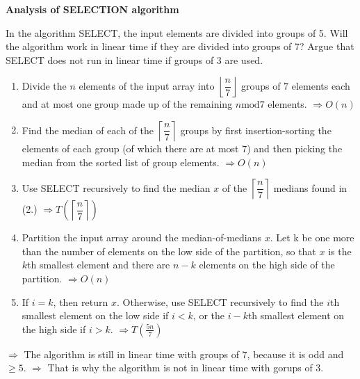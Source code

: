 \question \textbf{Analysis of SELECTION algorithm}

In the algorithm SELECT, the input elements are divided into groups of 5. Will the algorithm work in linear time if they are divided into groups of 7? Argue that SELECT does not run in linear time if groups of 3 are used.


\begin{solution}
\begin{enumerate}
\item Divide the \(n\) elements of the input array into \(\left\lfloor\dfrac{n}{7}\right\rfloor\) groups of \(7\) elements each and at most one group made up of the remaining \(n \text{mod} 7\) elements.
\(\Rightarrow O(n)\)
\item Find the median of each of the \(\left\lceil\dfrac{n}{7}\right\rceil\) groups by first insertion-sorting the elements of each group (of which there are at most \(7\)) and then picking the median from the sorted list of group elements.
\(\Rightarrow O(n)\)
\item Use SELECT recursively to find the median \(x\) of the \(\left\lceil\dfrac{n}{7}\right\rceil\) medians found in (2.)
\(\Rightarrow T(\left\lceil\dfrac{n}{7}\right\rceil)\)
\item Partition the input array around the median-of-medians \(x\). Let k be one more than the number of elements on the low side of the partition, so that \(x\) is the \(k\)th smallest element and there are \(n-k\) elements on the high side of the partition.
\(\Rightarrow O(n)\)
\item If \(i=k\), then return \(x\). Otherwise, use SELECT recursively to find the \(i\)th smallest element on the low side if \(i<k\), or the \(i-k\)th smallest element on the high side if \(i>k\).
\(\Rightarrow T(\frac{5n}{7})\)
\end{enumerate}

\(\Rightarrow\) The algorithm is still in linear time with groups of \(7\), because it is odd and \(\geq 5\).
\(\Rightarrow\) That is why the algorithm is not in linear time with gorups of \(3\).
\end{solution}

